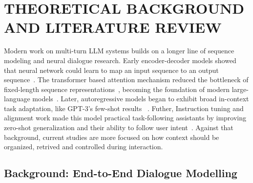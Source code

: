 \chapter{THEORETICAL BACKGROUND AND LITERATURE REVIEW}\label{sec2}
\vspace{-3em}






Modern work on multi-turn LLM systems builds on a longer line of sequence modeling  and neural dialogue research. Early encoder-decoder models showed that neural network could learn to map an input sequence to an output sequence~\cite{sutskever2014seq2seq}. The transformer based attention mechanism  reduced the bottleneck of fixed-length sequence representations~\cite{bahdanau2014attention}, becoming the foundation of modern large-language models~\cite{vaswani2017attention}. Later, autoregressive models began to exhibit broad in-context task adaptation, like GPT-3's few-shot results ~\cite{brown2020gpt3}. Futher, Instruction tuning and alignment work made this model practical task-following assistants by improving zero-shot generalization and their ability to follow user intent~\cite{wei2022flan,ouyang2022instructgpt}. Against that background, current studies are more focused on how context should be organized, retrived and controlled during interaction.



\section{Background: End-to-End Dialogue Modelling}\label{subsec:dialogue_background}

